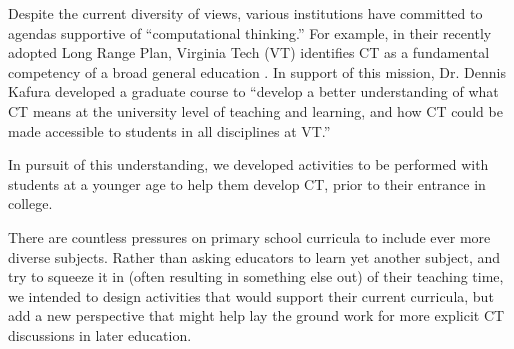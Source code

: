 \documentclass{acm_proc_article-sp}
\begin{document}
Despite the current diversity of views, various institutions have committed to agendas supportive of ``computational thinking.'' 
For example, in their recently adopted Long Range Plan, Virginia Tech (VT) identifies CT as a fundamental competency of a broad general education \cite{vtlongrange}. 
In support of this mission, Dr. Dennis Kafura developed a graduate course to ``develop a better understanding of what CT means at the university level of teaching and learning, and how CT could be made accessible to students in all disciplines at VT.''

In pursuit of this understanding, we developed activities to be performed with students at a younger age to help them develop CT, prior to their entrance in college.

There are countless pressures on primary school curricula to include ever more diverse subjects.
Rather than asking educators to learn yet another subject, and try to squeeze it in (often resulting in something else out) of their teaching time, we intended to design activities that would support their current curricula, but add a new perspective that might help lay the ground work for more explicit CT discussions in later education.
\end{document}
